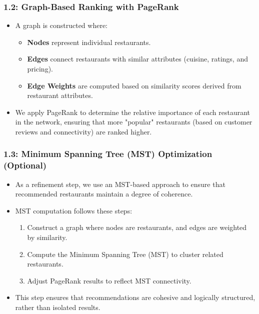 \documentclass[fontsize=11pt]{article}
\begin{document}
\subsubsection*{1.2: Graph-Based Ranking with PageRank}
\begin{itemize}
    \item A graph is constructed where: 
    \begin{itemize}
        \item \textbf{Nodes} represent individual restaurants.
        \item \textbf{Edges} connect restaurants with similar attributes (cuisine, ratings, and pricing).
        \item \textbf{Edge Weights} are computed based on similarity scores derived from restaurant attributes.
    \end{itemize}
    \item We apply PageRank to determine the relative importance of each restaurant in the network, ensuring that more "popular" restaurants (based on customer reviews and connectivity) are ranked higher.
\end{itemize}

\subsubsection*{1.3: Minimum Spanning Tree (MST) Optimization (Optional)}
\begin{itemize}
    \item As a refinement step, we use an MST-based approach to ensure that recommended restaurants maintain a degree of coherence.
    \item MST computation follows these steps: 
    \begin{enumerate}
        \item Construct a graph where nodes are restaurants, and edges are weighted by similarity.
        \item Compute the Minimum Spanning Tree (MST) to cluster related restaurants.
        \item Adjust PageRank results to reflect MST connectivity.
    \end{enumerate}
    \item This step ensures that recommendations are cohesive and logically structured, rather than isolated results.
\end{itemize}
\end{document}
